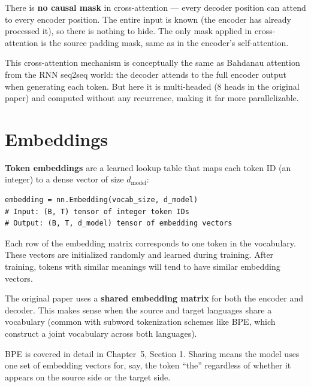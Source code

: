 There is \textbf{no causal mask} in cross-attention --- every decoder position can attend to every encoder position. The entire input is known (the encoder has already processed it), so there is nothing to hide. The only mask applied in cross-attention is the source padding mask, same as in the encoder's self-attention.

This cross-attention mechanism is conceptually the same as Bahdanau attention from the RNN seq2seq world: the decoder attends to the full encoder output when generating each token. But here it is multi-headed (8 heads in the original paper) and computed without any recurrence, making it far more parallelizable.

\section{Embeddings}

\textbf{Token embeddings} are a learned lookup table that maps each token ID (an integer) to a dense vector of size $d_{\text{model}}$:

\concepttag
\begin{lstlisting}
embedding = nn.Embedding(vocab_size, d_model)
# Input: (B, T) tensor of integer token IDs
# Output: (B, T, d_model) tensor of embedding vectors
\end{lstlisting}

Each row of the embedding matrix corresponds to one token in the vocabulary. These vectors are initialized randomly and learned during training. After training, tokens with similar meanings will tend to have similar embedding vectors.

The original paper uses a \textbf{shared embedding matrix} for both the encoder and decoder. This makes sense when the source and target languages share a vocabulary (common with subword tokenization schemes like BPE, which construct a joint vocabulary across both languages).

BPE is covered in detail in Chapter~5, Section 1. Sharing means the model uses one set of embedding vectors for, say, the token ``the'' regardless of whether it appears on the source side or the target side.

